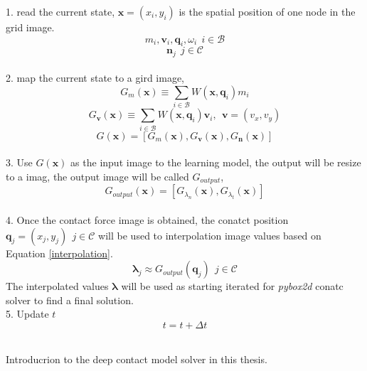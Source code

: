 \begin{algorithm}[!h]
        {
            1. read the current state, $\mathbf{x}=(x_i, y_i)$ is the spatial position of one node in the grid image.
                $$m_i, \pmb{v}_i, \pmb{q}_i, \omega_{i}~~i\in\mathcal{B}$$
                $$\pmb{n}_j~~j\in\mathcal{C}$$ \\
            2. map the current state to a gird image,
                $$G_{m}(\mathbf{x}) \equiv \sum_{i\in \mathcal{B}}W(\mathbf{x}, \pmb{q}_{i})m_i$$ 
                $$G_{\pmb{v}}(\mathbf{x}) \equiv \sum_{i\in \mathcal{B}}W(\mathbf{x}, \pmb{q}_{i})\pmb{v}_i,~~\pmb{v}=(v_x, v_y)$$
                $$G(\mathbf{x}) = [G_{m}(\mathbf{x}), G_{\pmb{v}}(\mathbf{x}), G_{\pmb{n}}(\mathbf{x})]$$ \\
            3. Use $G(\mathbf{x})$ as the input image to the learning model, the output will be resize to a imag, the output image will be called $G_{output}$,
                $$G_{output}(\mathbf{x}) = [G_{\lambda_{n}}(\mathbf{x}), G_{{\lambda}_{t}}(\mathbf{x})]$$ \\
            4. Once the contact force image is obtained,  the conatct position $\pmb{q}_{j} = (x_{j}, y_{j})~~j\in\mathcal{C}$  will be used to interpolation image values based on Equation \ref{interpolation}.
                $$\pmb{\lambda}_j \approx G_{output}(\pmb{q}_j)~~j\in\mathcal{C}$$ 
            The interpolated values $\pmb{\lambda}$ will be used as starting iterated for \textit{pybox2d} conatc solver to find a final solution. \\
            5. Update $t$
                $$t = t + \Delta t$$ \\
        }
        \caption{Introducrion to the deep contact model solver in this thesis.}
        \label{al:basic}
\end{algorithm}
